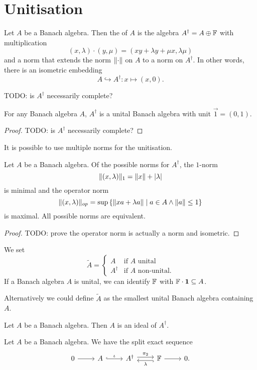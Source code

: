 \section{Unitisation}
\begin{definition}
Let $A$ be a Banach algebra. Then the  of $A$ is the algebra $A^\dagger = A\oplus \mathbb{F}$ with multiplication
\[ (x,\lambda)\cdot (y,\mu) = (xy+\lambda y + \mu x, \lambda\mu) \]
and a norm that extends the norm $\lVert\cdot\rVert$ on $A$ to a norm on $A^\dagger$. In other words, there is an isometric embedding
\[ A \hookrightarrow A^\dagger: x\mapsto (x,0). \]
\end{definition}
TODO: is $A^\dagger$ necessarily complete?
\begin{lemma}
For any Banach algebra $A$, $A^\dagger$ is a unital Banach algebra with unit $\vec{1} = (0,1)$.
\end{lemma}
\begin{proof}
TODO: is $A^\dagger$ necessarily complete?
\end{proof}
It is possible to use multiple norms for the unitisation.
\begin{proposition} \label{normsOfUnitisation}
Let $A$ be a Banach algebra. Of the possible norms for $A^\dagger$, the $1$-norm
\[ \lVert(x,\lambda)\rVert_1 = \lVert x\rVert+|\lambda| \]
is minimal and the operator norm
\[ \lVert(x,\lambda)\rVert_{op} = \sup\left\{ \lVert xa + \lambda a\rVert \;\middle|\; a\in A \land \lVert a\rVert\leq 1 \right\} \]
is maximal. All possible norms are equivalent.
\end{proposition}
\begin{proof}
TODO: prove the operator norm is actually a norm and isometric.
\end{proof}

We set
\[ \tilde{A} = \begin{cases}
A & \text{if $A$ unital} \\
A^\dagger & \text{if $A$ non-unital.}
\end{cases} \]
If a Banach algebra $A$ is unital, we can identify $\mathbb{F}$ with $\mathbb{F}\cdot \boldsymbol{\mathrm{1}} \subseteq A$.

Alternatively we could define $\tilde{A}$ as the smallest unital Banach algebra containing $A$.

\begin{lemma}
Let $A$ be a Banach algebra. Then $A$ is an ideal of $A^\dagger$.
\end{lemma}

\begin{lemma}
Let $A$ be a Banach algebra. We have the split exact sequence
\[ \begin{tikzcd}
0 \rar & A \rar[hook, "\iota"] & A^\dagger \rar[shift left, "\pi_2"] & \lar[hook, shift left, "\lambda"] \F \rar & 0.
\end{tikzcd} \]
\end{lemma}

